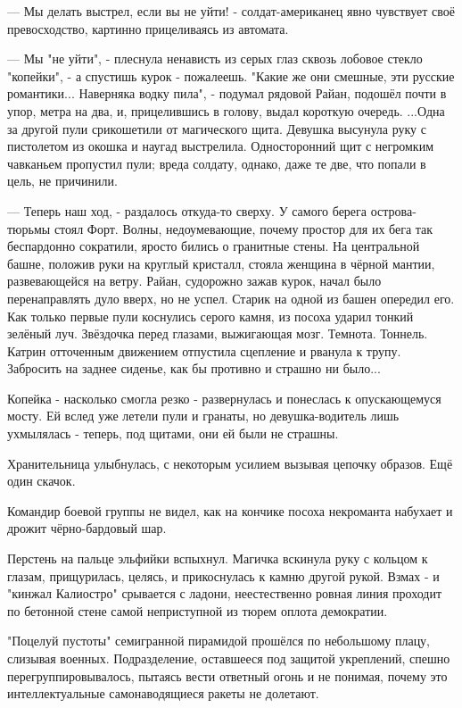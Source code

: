 

--- Мы делать выстрел, если вы не уйти! - солдат-американец явно чувствует своё превосходство, картинно прицеливаясь из автомата.

--- Мы "не уйти", - плеснула ненависть из серых глаз сквозь лобовое стекло "копейки", - а спустишь курок - пожалеешь.
"Какие же они смешные, эти русские романтики... Наверняка водку пила", - подумал рядовой Райан, подошёл почти в упор, метра на два, и, прицелившись в голову, выдал короткую очередь.
...Одна за другой пули срикошетили от магического щита. Девушка высунула руку с пистолетом из окошка и наугад выстрелила. Односторонний щит с негромким чавканьем пропустил пули; вреда солдату, однако, даже те две, что попали в цель, не причинили.


--- Теперь наш ход, - раздалось откуда-то сверху. У самого берега острова-тюрьмы стоял Форт. Волны, недоумевающие, почему простор для их бега так беспардонно сократили, яросто бились о гранитные стены. На центральной башне, положив руки на круглый кристалл, стояла женщина в чёрной мантии, развевающейся на ветру.
Райан, судорожно зажав курок, начал было перенаправлять дуло вверх, но не успел. Старик на одной из башен опередил его. Как только первые пули коснулись серого камня, из посоха ударил тонкий зелёный луч. Звёздочка перед глазами, выжигающая мозг. Темнота. Тоннель.
Катрин отточенным движением отпустила сцепление и рванула к трупу. Забросить на заднее сиденье, как бы противно и страшно ни было...

Копейка - насколько смогла резко - развернулась и понеслась к опускающемуся мосту. Ей вслед уже летели пули и гранаты, но девушка-водитель лишь ухмылялась - теперь, под щитами, они ей были не страшны.

Хранительница улыбнулась, с некоторым усилием вызывая цепочку образов. Ещё один скачок.

Командир боевой группы не видел, как на кончике посоха некроманта набухает и дрожит чёрно-бардовый шар.

Перстень на пальце эльфийки вспыхнул. Магичка вскинула руку с кольцом к глазам, прищурилась, целясь, и прикоснулась к камню другой рукой. Взмах - и "кинжал Калиостро" срывается с ладони, неестественно ровная линия проходит по бетонной стене самой неприступной из тюрем оплота демократии.

"Поцелуй пустоты" семигранной пирамидой прошёлся по небольшому плацу, слизывая военных. Подразделение, оставшееся под защитой укреплений, спешно перегруппировывалось, пытаясь вести ответный огонь и не понимая, почему это интеллектуальные самонаводящиеся ракеты не долетают.

